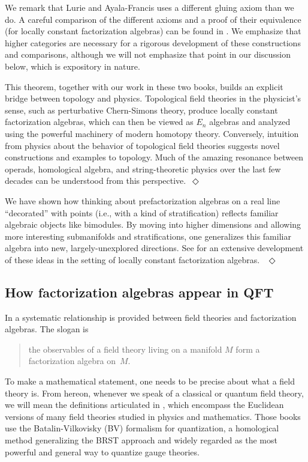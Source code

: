 \documentclass[11pt]{amsart}
\begin{document}
We remark that Lurie and Ayala-Francis uses a different gluing axiom than we do. A careful comparison of the different axioms and a proof of their equivalence (for locally constant factorization algebras) can be found in \cite{Matsuoka}. We emphasize that higher categories are necessary for a rigorous development of these constructions and comparisons, although we will not emphasize that point in our discussion below, which is expository in nature.

\begin{rmk}
This theorem, together with our work in these two books, builds an explicit bridge between topology and physics. Topological field theories in the physicist's sense, such as perturbative Chern-Simons theory, produce locally constant factorization algebras, which can then be viewed as $E_n$ algebras and analyzed using the powerful machinery of modern homotopy theory. Conversely, intuition from physics about the behavior of topological field theories suggests novel constructions and examples to topology. Much of the amazing resonance between operads, homological algebra, and string-theoretic physics over the last few decades can be understood from this perspective.~\hfill $\Diamond$
\end{rmk}

\begin{rmk}
We have shown how thinking about prefactorization algebras on a real line ``decorated'' with points (i.e., with a kind of stratification) reflects familiar algebraic objects like bimodules. By moving into higher dimensions and allowing more interesting submanifolds and stratifications, one generalizes this familiar algebra into new, largely-unexplored directions. See \cite{AyalaFrancisTanaka} for an extensive development of these ideas in the setting of locally constant factorization algebras.
~\hfill $\Diamond$
\end{rmk}

\subsection{How factorization algebras appear in QFT}

In \cite{CG1, CG2} a systematic relationship is provided between field theories and factorization algebras.
The slogan is 
\begin{quote}
the observables of a field theory living on a manifold $M$ form a factorization algebra on~$M$. 
\end{quote}
To make a mathematical statement, one needs to be precise about what a field theory is.
From hereon, whenever we speak of a classical or quantum field theory, we will mean the definitions articulated in \cite{CosBook,CG1, CG2}, which encompass the Euclidean versions of many field theories studied in physics and mathematics.
Those books use the Batalin-Vilkovisky (BV) formalism for quantization, a homological method generalizing the BRST approach and widely regarded as the most powerful and general way to quantize gauge theories. 
\end{document}
